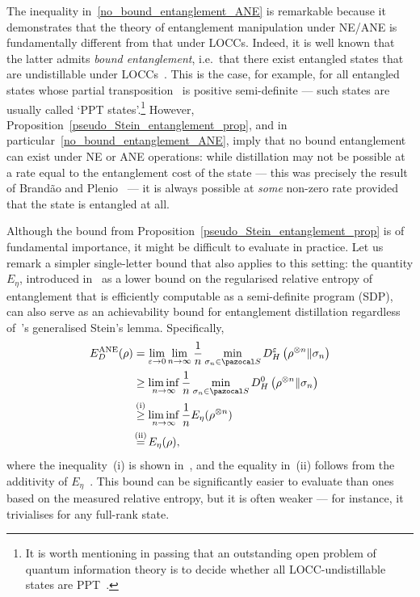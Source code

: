 \documentclass[11pt,notitlepage,tightenlines,nofootinbib,superscriptaddress]{revtex4-1}
\begin{document}
The inequality in~\eqref{no_bound_entanglement_ANE} is remarkable because it demonstrates that the theory of entanglement manipulation under NE/ANE is fundamentally different from that under LOCCs. Indeed, it is well known that the latter admits \emph{bound entanglement}, i.e.\ that there exist entangled states that are undistillable under LOCCs~\cite{HorodeckiBound}. This is the case, for example, for all entangled states whose partial transposition~\cite{PeresPPT} is positive semi-definite --- such states are usually called `PPT states'.\footnote{It is worth mentioning in passing that an outstanding open problem of quantum information theory is to decide whether all LOCC-undistillable states are PPT~\cite{Horodecki-open-problems}.} However, Proposition~\ref{pseudo_Stein_entanglement_prop}, and in particular~\eqref{no_bound_entanglement_ANE}, imply that no bound entanglement can exist under NE or ANE operations: while distillation may not be possible at a rate equal to the entanglement cost of the state --- this was precisely the result of Brand\~{a}o and Plenio~\cite{BrandaoPlenio1, BrandaoPlenio2} --- it is always possible at \emph{some} non-zero rate provided that the state is entangled at all.

Although the bound from Proposition~\ref{pseudo_Stein_entanglement_prop} is of fundamental importance, it might be difficult to evaluate in practice. Let us remark a simpler single-letter bound that also applies to this setting: the quantity $E_\eta$, introduced in~\cite{irreversibility-PPT} as a lower bound on the regularised relative entropy of entanglement that is efficiently computable as a semi-definite program (SDP), can also serve as an achievability bound for entanglement distillation regardless of~\cite{Brandao2010}'s generalised Stein's lemma. Specifically,
\begin{equation}\begin{aligned}
        E_D^{\mathrm{ANE}}(\rho) &= \lim_{\epsilon \to 0} \lim_{n \to \infty} \frac1n \min_{\sigma_n \in \SEP} D^\epsilon_{H} \left(\rho^{\otimes n} \| \sigma_n\right)\\
        &\geq \liminf_{n \to \infty} \frac1n \min_{\sigma_n \in \SEP} D^0_{H} \left(\rho^{\otimes n} \| \sigma_n\right)\\
        &\textgeq{(i)} \liminf_{n \to \infty} \frac1n E_\eta(\rho^{\otimes n})\\
        &\texteq{(ii)}  E_\eta(\rho),
\end{aligned}\end{equation}
where the inequality~(i) is shown in~\cite[Proposition~1]{irreversibility-PPT}, and the equality in~(ii) follows from the additivity of $E_\eta$~\cite{irreversibility-PPT}. This bound can be significantly easier to evaluate than ones based on the measured relative entropy, but it is often weaker --- for instance, it trivialises for any full-rank state.
\end{document}
